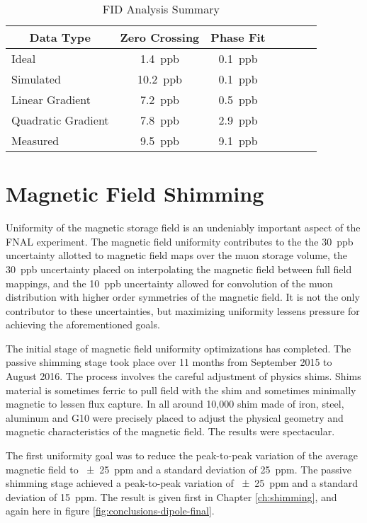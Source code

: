 \begin{table}[h]
\label{tab:conclusion-fid-summary}
\caption{FID Analysis Summary}
\centering
\begin{tabular}{l c c c c c c}
    \hline
    \multicolumn{1}{c}{Data Type} & Zero Crossing & Phase Fit \\
    \hline
    Ideal                & \SI{1.4}{ppb}  & \SI{0.1}{ppb} \\
    Simulated            & \SI{10.2}{ppb} & \SI{0.1}{ppb} \\
    Linear Gradient      & \SI{7.2}{ppb}  & \SI{0.5}{ppb} \\
    Quadratic Gradient   & \SI{7.8}{ppb}  & \SI{2.9}{ppb} \\
    Measured             & \SI{9.5}{ppb}  & \SI{9.1}{ppb} \\
    \hline
\end{tabular}
\end{table}

\section{Magnetic Field Shimming}

Uniformity of the magnetic storage field is an undeniably important aspect of the FNAL \mugmtwo experiment.  The magnetic field uniformity contributes to the the \SI{30}{ppb} uncertainty allotted to magnetic field maps over the muon storage volume, the \SI{30}{ppb} uncertainty placed on interpolating the magnetic field between full field mappings, and the \SI{10}{ppb} uncertainty allowed for convolution of the muon distribution with higher order symmetries of the magnetic field. It is not the only contributor to these uncertainties, but maximizing uniformity lessens pressure for achieving the aforementioned goals.

The initial stage of magnetic field uniformity optimizations has completed.  The passive shimming stage took place over 11 months from September 2015 to August 2016.  The process involves the careful adjustment of physics shims.  Shims material is sometimes ferric to pull field with the shim and sometimes minimally magnetic to lessen flux capture.  In all around 10,000 shim made of iron, steel, aluminum and G10 were precisely placed to adjust the physical geometry and magnetic characteristics of the magnetic field.  The results were spectacular.

The first uniformity goal was to reduce the peak-to-peak variation of the average magnetic field to \SI{\pm 25}{ppm} and a standard deviation of \SI{25}{ppm}.  The passive shimming stage achieved a peak-to-peak variation of \SI{\pm 25}{ppm} and a standard deviation of \SI{15}{ppm}.  The result is given first in Chapter \ref{ch:shimming}, and again here in figure \ref{fig:conclusions-dipole-final}.  

